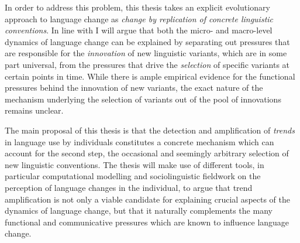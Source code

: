 
In order to address this problem, this thesis takes an explicit evolutionary approach to language change as \emph{change by replication of concrete linguistic conventions}.
In line with \citet{Croft2000} I will argue that both the micro- and macro-level dynamics of language change can be explained by separating out pressures that are responsible for the \emph{innovation} of new linguistic variants, which are in some part universal, from the pressures that drive the \emph{selection} of specific variants at certain points in time.
While there is ample empirical evidence for the functional pressures behind the innovation of new variants, the exact nature of the mechanism underlying the selection of variants out of the pool of innovations remains unclear.

The main proposal of this thesis is that the detection and amplification of \emph{trends} in language use by individuals constitutes a concrete mechanism which can account for the second step, the occasional and seemingly arbitrary selection of new linguistic conventions.
The thesis will make use of different tools, in particular computational modelling and sociolinguistic fieldwork on the perception of language changes in the individual, to argue that trend amplification is not only a viable candidate for explaining crucial aspects of the dynamics of language change, but that it naturally complements the many functional and communicative pressures which are known to influence language change. %

